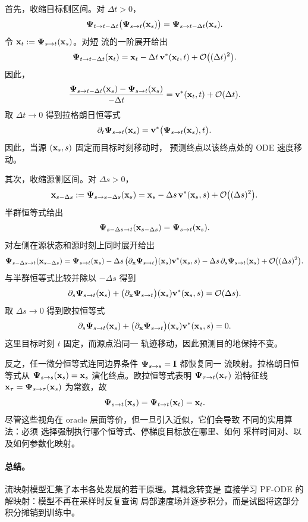 首先，收缩目标侧区间。对 $\Delta t>0$，
\[
    {\bm{\Psi}}_{t\to t-\Delta t}
    \big({\bm{\Psi}}_{s\to t}({\mathbf{x}}_s)\big)
    =
    {\bm{\Psi}}_{s\to t-\Delta t}({\mathbf{x}}_s).
\]
令 ${\mathbf{x}}_t:={\bm{\Psi}}_{s\to t}({\mathbf{x}}_s)$。对短
流的一阶展开给出
\[
    {\bm{\Psi}}_{t\to t-\Delta t}({\mathbf{x}}_t)
    =
    {\mathbf{x}}_t-\Delta t\,{\mathbf{v}}^*({\mathbf{x}}_t,t)
    +\mathcal{O}\big((\Delta t)^2\big).
\]
因此，
\[
    \frac{
    {\bm{\Psi}}_{s\to t-\Delta t}({\mathbf{x}}_s)
    -
    {\bm{\Psi}}_{s\to t}({\mathbf{x}}_s)}
    {-\Delta t}
    =
    {\mathbf{v}}^*({\mathbf{x}}_t,t)
    +\mathcal{O}(\Delta t).
\]
取 $\Delta t\to0$ 得到拉格朗日恒等式
\[
    \partial_t{\bm{\Psi}}_{s\to t}({\mathbf{x}}_s)
    =
    {\mathbf{v}}^*\big({\bm{\Psi}}_{s\to t}({\mathbf{x}}_s),t\big).
\]
因此，当源 $({\mathbf{x}}_s,s)$ 固定而目标时刻移动时，
预测终点以该终点处的 ODE 速度移动。

其次，收缩源侧区间。对 $\Delta s>0$，
\[
    {\mathbf{x}}_{s-\Delta s}
    :=
    {\bm{\Psi}}_{s\to s-\Delta s}({\mathbf{x}}_s)
    =
    {\mathbf{x}}_s-\Delta s\,{\mathbf{v}}^*({\mathbf{x}}_s,s)
    +\mathcal{O}\big((\Delta s)^2\big).
\]
半群恒等式给出
\[
    {\bm{\Psi}}_{s-\Delta s\to t}({\mathbf{x}}_{s-\Delta s})
    =
    {\bm{\Psi}}_{s\to t}({\mathbf{x}}_s).
\]
对左侧在源状态和源时刻上同时展开给出
\[
    {\bm{\Psi}}_{s-\Delta s\to t}({\mathbf{x}}_{s-\Delta s})
    =
    {\bm{\Psi}}_{s\to t}({\mathbf{x}}_s)
    -
    \Delta s\,
    \big(\partial_{{\mathbf{x}}}{\bm{\Psi}}_{s\to t}\big)({\mathbf{x}}_s){\mathbf{v}}^*({\mathbf{x}}_s,s)
    -
    \Delta s\,
    \partial_s{\bm{\Psi}}_{s\to t}({\mathbf{x}}_s)
    +
    \mathcal{O}\big((\Delta s)^2\big).
\]
与半群恒等式比较并除以 $-\Delta s$ 得到
\[
    \partial_s{\bm{\Psi}}_{s\to t}({\mathbf{x}}_s)
    +
    \big(\partial_{{\mathbf{x}}}{\bm{\Psi}}_{s\to t}\big)({\mathbf{x}}_s){\mathbf{v}}^*({\mathbf{x}}_s,s)
    =
    \mathcal{O}(\Delta s).
\]
取 $\Delta s\to0$ 得到欧拉恒等式
\[
    \partial_s{\bm{\Psi}}_{s\to t}({\mathbf{x}}_s)
    +
    \big(\partial_{{\mathbf{x}}}{\bm{\Psi}}_{s\to t}\big)({\mathbf{x}}_s){\mathbf{v}}^*({\mathbf{x}}_s,s)
    =
    0.
\]
这里目标时刻 $t$ 固定，而源点沿同一
轨迹移动，因此预测目的地保持不变。

反之，任一微分恒等式连同边界条件 ${\bm{\Psi}}_{s\to s}={\mathbf{I}}$ 都恢复同一
流映射。拉格朗日恒等式从
${\bm{\Psi}}_{s\to s}({\mathbf{x}}_s)={\mathbf{x}}_s$ 演化终点。欧拉恒等式表明
${\bm{\Psi}}_{\tau\to t}({\mathbf{x}}_\tau)$ 沿特征线
${\mathbf{x}}_\tau={\bm{\Psi}}_{s\to \tau}({\mathbf{x}}_s)$ 为常数，故
\[
    {\bm{\Psi}}_{s\to t}({\mathbf{x}}_s)
    =
    {\bm{\Psi}}_{t\to t}({\mathbf{x}}_t)
    =
    {\mathbf{x}}_t.
\]
尽管这些视角在 oracle 层面等价，但一旦引入近似，它们会导致
不同的实用算法：必须
选择强制执行哪个恒等式、停梯度目标放在哪里、如何
采样时间对、以及如何参数化映射。


\paragraph{总结。}
流映射模型汇集了本书各处发展的若干原理。其概念转变是
直接学习 PF-ODE 的解映射：模型不再在采样时反复查询
局部速度场并逐步积分，而是试图将这部分积分摊销到训练中。

